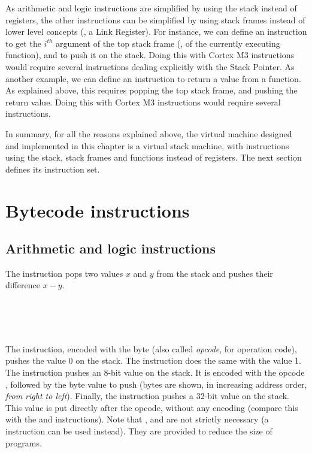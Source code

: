 As arithmetic and logic instructions are simplified by using the stack instead
of registers, the other instructions can be simplified by using stack frames
instead of lower level concepts (\eg, a Link Register). For instance, we can
define an instruction to get the $i^{th}$ argument of the top stack frame (\ie,
of the currently executing function), and to push it on the stack. Doing this
with Cortex M3 instructions would require several instructions dealing
explicitly with the Stack Pointer. As another example, we can define an
instruction to return a value from a function. As explained above, this
requires popping the top stack frame, and pushing the return value. Doing this
with Cortex M3 instructions would require several instructions.

In summary, for all the reasons explained above, the virtual machine designed
and implemented in this chapter is a virtual stack machine, with instructions
using the stack, stack frames and functions instead of registers. The next
section defines its instruction set.

\section{Bytecode instructions}

\subsection{Arithmetic and logic instructions}\label{subsection:alu-insns}

\begin{Figure}
  

  \caption{The  instruction pops two values $x$ and $y$ from the
    stack and pushes their difference $x-y$.}\label{fig:sub-insn}
\end{Figure}

\begin{Paragraph}[]
\\
\\
\\
\end{Paragraph}

The  instruction, encoded with the byte  (also called
{\em opcode}, for operation code), pushes the value 0 on the stack. The
 instruction does the same with the value 1. The 
instruction pushes an 8-bit value on the stack. It is encoded with the opcode
, followed by the byte value to push (bytes are shown, in increasing
address order, {\em from right to left}). Finally, the  instruction
pushes a 32-bit value on the stack. This value is put directly after the
opcode, without any encoding (compare this with the  and 
instructions). Note that ,  and  are not
strictly necessary (a  instruction can be used instead). They are
provided to reduce the size of programs.


